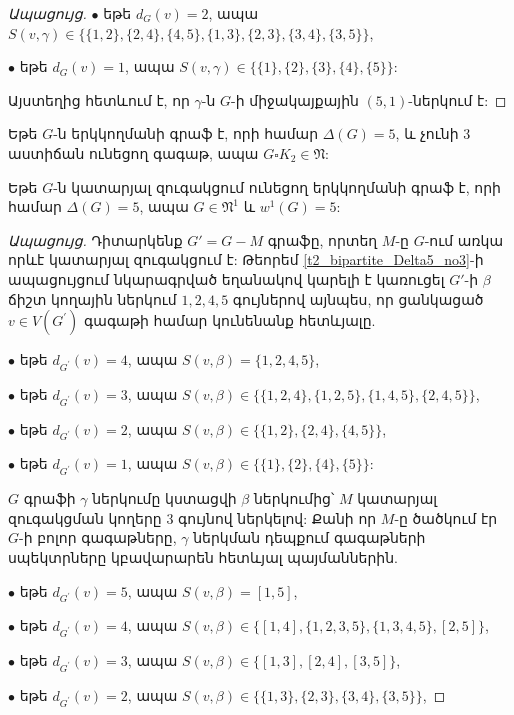\begin{hide}
\begin{proof}[Ապացույց]
$\bullet$ եթե $d_{G}(v)=2$, ապա
$S(v,\gamma)\in
\{\{1,2\},\{2,4\},\{4,5\},\{1,3\},\{2,3\},\{3,4\},\{3,5\}\}$,

$\bullet$ եթե $d_{G}(v)=1$, ապա $S(v,\gamma)\in
\{\{1\},\{2\},\{3\},\{4\},\{5\}\}$:

Այստեղից հետևում է, որ $\gamma$-ն $G$-ի միջակայքային $(5,1)$-ներկում է:
\end{proof}

\begin{corollary}
\label{c2_bipartite_Delta5_no3} Եթե $G$-ն երկկողմանի գրաֆ է, որի համար $\Delta(G) =
5$, և չունի $3$ աստիճան ունեցող գագաթ, ապա $G\square K_{2}\in \mathfrak{N}$:
\end{corollary}

\begin{theorem}
\label{t2_bipartite_Delta5_nopm} Եթե $G$-ն կատարյալ զուգակցում ունեցող երկկողմանի գրաֆ է, որի համար $\Delta(G)=5$, ապա $G\in \mathfrak{N}^{1}$ և
$w^{1}(G)=5$:
\end{theorem}
\begin{proof}[Ապացույց]
Դիտարկենք $G' = G - M$ գրաֆը, որտեղ $M$-ը $G$-ում առկա որևէ կատարյալ զուգակցում է: Թեորեմ \ref{t2_bipartite_Delta5_no3}-ի ապացույցում նկարագրված եղանակով կարելի է կառուցել $G'$-ի $\beta$ ճիշտ կողային ներկում $1,2,4,5$ գույներով այնպես, որ ցանկացած $v\in
V(G^{\prime})$ գագաթի համար կունենանք հետևյալը.

$\bullet$ եթե $d_{G^{\prime}}(v)=4$, ապա $S(v,\beta)=
\{1,2,4,5\}$,

$\bullet$ եթե $d_{G^{\prime}}(v)=3$, ապա
$S(v,\beta)\in \{\{1,2,4\},\{1,2,5\},\{1,4,5\},\{2,4,5\}\}$,

$\bullet$ եթե $d_{G^{\prime}}(v)=2$, ապա $S(v,\beta)\in
\{\{1,2\},\{2,4\},\{4,5\}\}$,

$\bullet$ եթե $d_{G^{\prime}}(v)=1$, ապա $S(v,\beta)\in
\{\{1\},\{2\},\{4\},\{5\}\}$:

$G$ գրաֆի $\gamma$ ներկումը կստացվի $\beta$ ներկումից՝ $M$ կատարյալ զուգակցման կողերը $3$ գույնով ներկելով: Քանի որ $M$-ը ծածկում էր $G$-ի բոլոր գագաթները, $\gamma$ ներկման դեպքում գագաթների սպեկտրները կբավարարեն հետևյալ պայմաններին.

$\bullet$ եթե $d_{G^{\prime}}(v)=5$, ապա $S(v,\beta)=
[1,5]$,

$\bullet$ եթե $d_{G^{\prime}}(v)=4$, ապա
$S(v,\beta)\in \{[1,4],\{1,2,3,5\},\{1,3,4,5\},[2,5]\}$,

$\bullet$ եթե $d_{G^{\prime}}(v)=3$, ապա $S(v,\beta)\in
\{[1,3],[2,4],[3,5]\}$,

$\bullet$ եթե $d_{G^{\prime}}(v)=2$, ապա $S(v,\beta)\in
\{\{1,3\},\{2,3\},\{3,4\},\{3,5\}\}$,


\end{proof}
\end{hide}
